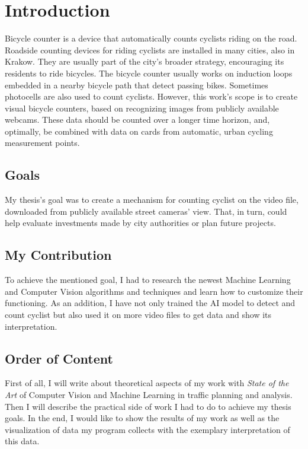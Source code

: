 \chapter{Introduction}
\label{cha:introduction}

Bicycle counter is a device that automatically counts cyclists riding on the road. Roadside counting devices for riding cyclists are installed in many cities, also in Krakow. They are usually part of the city's broader strategy, encouraging its residents to ride bicycles. The bicycle counter usually works on induction loops embedded in a nearby bicycle path that detect passing bikes. Sometimes photocells are also used to count cyclists. However, this work's scope is to create visual bicycle counters, based on recognizing images from publicly available webcams. These data should be counted over a longer time horizon, and, optimally, be combined with data on cards from automatic, urban cycling measurement points.

\section{Goals}
\label{sec:goals}

My thesis's goal was to create a mechanism for counting cyclist on the video file, downloaded from publicly available street cameras' view. That, in turn, could help evaluate investments made by city authorities or plan future projects.

\section{My Contribution}
\label{sec:myContribution}

To achieve the mentioned goal, I had to research the newest Machine Learning and Computer Vision algorithms and techniques and learn how to customize their functioning. As an addition, I have not only trained the AI model to detect and count cyclist but also used it on more video files to get data and show its interpretation.

\section{Order of Content}
\label{sec:orderOfContent}
First of all, I will write about theoretical aspects of my work with \textit{State of the Art} of Computer Vision and Machine Learning in traffic planning and analysis. Then I will describe the practical side of work I had to do to achieve my thesis goals. In the end, I would like to show the results of my work as well as the visualization of data my program collects with the exemplary interpretation of this data. 














